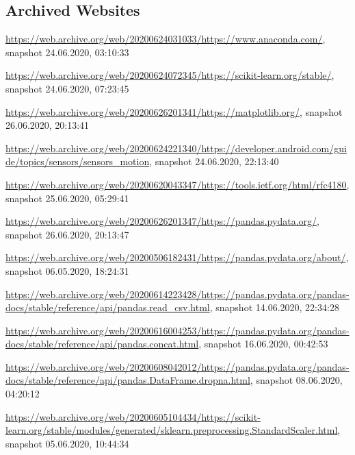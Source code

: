 \begin{appendices}

	


\section{Archived Websites}
\label{appendix:archivedWebsites}
\sloppy
\url{https://web.archive.org/web/20200624031033/https://www.anaconda.com/}, snapshot 24.06.2020, 03:10:33

\url{https://web.archive.org/web/20200624072345/https://scikit-learn.org/stable/}, snapshot 24.06.2020, 07:23:45

\url{https://web.archive.org/web/20200626201341/https://matplotlib.org/}, snapshot 26.06.2020, 20:13:41

\url{https://web.archive.org/web/20200624221340/https://developer.android.com/guide/topics/sensors/sensors_motion}, snapshot 24.06.2020, 22:13:40

\url{https://web.archive.org/web/20200620043347/https://tools.ietf.org/html/rfc4180}, snapshot 25.06.2020, 05:29:41

\url{https://web.archive.org/web/20200626201347/https://pandas.pydata.org/}, snapshot 26.06.2020, 20:13:47

\url{https://web.archive.org/web/20200506182431/https://pandas.pydata.org/about/}, snapshot 06.05.2020, 18:24:31

\url{https://web.archive.org/web/20200614223428/https://pandas.pydata.org/pandas-docs/stable/reference/api/pandas.read_csv.html}, snapshot 14.06.2020, 22:34:28

\url{https://web.archive.org/web/20200616004253/https://pandas.pydata.org/pandas-docs/stable/reference/api/pandas.concat.html}, snapshot 16.06.2020, 00:42:53

\url{https://web.archive.org/web/20200608042012/https://pandas.pydata.org/pandas-docs/stable/reference/api/pandas.DataFrame.dropna.html}, snapshot 08.06.2020, 04:20:12

\url{https://web.archive.org/web/20200605104434/https://scikit-learn.org/stable/modules/generated/sklearn.preprocessing.StandardScaler.html}, snapshot 05.06.2020, 10:44:34


\end{appendices}
